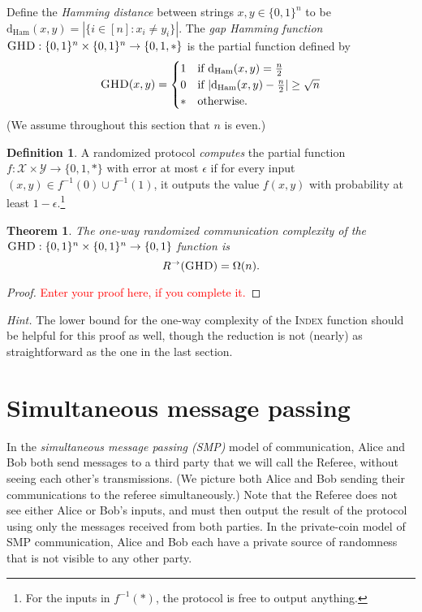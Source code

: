 \documentclass[11pt]{amsart}
\theoremstyle{plain}
\newtheorem{theorem}{Theorem}
\theoremstyle{definition}
\newtheorem{definition}{Definition}
\theoremstyle{plain}
\newcommand{\calX}{\mathcal{X}}
\newcommand{\calY}{\mathcal{Y}}
\newcommand{\dHam}{\mathrm{d}_{\mathrm{Ham}}}
\newcommand{\GHD}{\textsc{GHD}}
\newcommand{\replacethistext}[1]{\textcolor{red}{#1}}
\begin{document}
Define the \emph{Hamming distance} between strings $x,y \in \{0,1\}^n$ to be $\dHam(x,y) = |\{i \in [n] : x_i \neq y_i\}|$.
The \emph{gap Hamming function} $\GHD : \{0,1\}^n \times \{0,1\}^n \to \{0,1,*\}$ is the partial function defined by
\[
\GHD(x,y) = \begin{cases}
1 & \mbox{if } \dHam(x,y) = \frac n2 \\
0 & \mbox{if } |\dHam(x,y) - \frac n2| \ge \sqrt{n} \\
* & \mbox{otherwise.}
\end{cases}
\] 
(We assume throughout this section that $n$ is even.)

\begin{definition}
A randomized protocol \emph{computes} the partial function $f : \calX \times \calY \to \{0,1,*\}$ with error at most $\epsilon$ if for every input $(x,y) \in f^{-1}(0) \cup f^{-1}(1)$, it outputs the value $f(x,y)$ with probability at least $1-\epsilon$.\footnote{For the inputs in $f^{-1}(*)$, the protocol is free to output anything.}
\end{definition}

\begin{theorem}
The one-way randomized communication complexity of the $\GHD : \{0,1\}^n \times \{0,1\}^n \to \{0,1\}$ function is
\[
R^\rightarrow(\GHD) = \Omega(n).
\]
\end{theorem}

\begin{proof}
\replacethistext{Enter your proof here, if you complete it.}
\end{proof}


\bigskip
\emph{Hint.} The lower bound for the one-way complexity of the \textsc{Index} function should be helpful for this proof as well, though the reduction is not (nearly) as straightforward as the one in the last section.


\newpage 
\section{Simultaneous message passing}

In the \emph{simultaneous message passing (SMP)} model of communication, Alice and Bob both send messages to a third party that we will call the Referee, without seeing each other's transmissions. (We picture both Alice and Bob sending their communications to the referee simultaneously.) Note that the Referee does not see either Alice or Bob's inputs, and must then output the result of the protocol using only the messages received from both parties. In the private-coin model of SMP communication, Alice and Bob each have a private source of randomness that is not visible to any other party.
\end{document}

